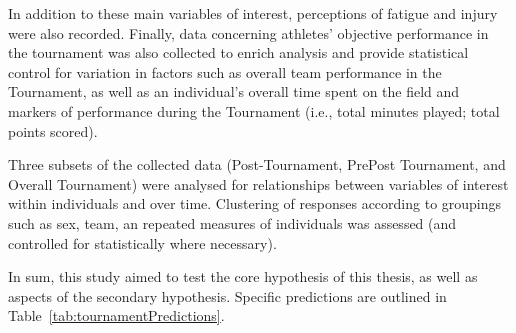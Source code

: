 \begin{CJK}{UTF8}{gbsn}
In addition to these main variables of interest, perceptions of fatigue and injury were also recorded.  Finally, data concerning athletes' objective performance in the tournament was also collected to enrich analysis and provide statistical control for variation in factors such as overall team performance in the Tournament, as well as an individual's overall time spent on the field and markers of performance during the Tournament (i.e., total minutes played; total points scored).

Three subsets of the collected data (Post-Tournament, PrePost Tournament, and Overall Tournament) were analysed for relationships between variables of interest within individuals and over time.  Clustering of responses according to groupings such as sex, team, an repeated measures of individuals was assessed (and controlled for statistically where necessary).

In sum, this study aimed to test the core hypothesis of this thesis, as well as aspects of the secondary hypothesis.  Specific predictions are outlined in Table~\ref{tab:tournamentPredictions}.










\end{CJK}
